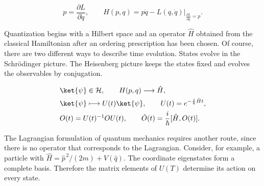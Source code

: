 \begin{equation}
  p=\frac{\partial L}{\partial\dot q},
  \qquad
  H(p,q)=
  \left.p\dot q-L(q,\dot q)\right|_{\frac{\partial L}{\partial\dot q}=p}.
  \label{eq:proposal-legendre-transform}
\end{equation}

Quantization begins with a Hilbert space and an operator $\hat H$ obtained from
the classical Hamiltonian after an ordering prescription has been chosen.  Of
course, there are two different ways to describe time evolution.  States
evolve in the Schr\"odinger picture.  The Heisenberg picture keeps the states
fixed and evolves the observables by conjugation.

\begin{align}
  &\ket{\psi}\in\mathcal H,
  \qquad H(p,q)\longrightarrow\hat H,
  \label{eq:proposal-quantum-bridge}\\
  &\ket{\psi}\longmapsto U(t)\ket{\psi},
  \qquad
  U(t)=e^{-\frac{i}{\hbar}\hat Ht},
  \label{eq:proposal-schrodinger-evolution}\\
  &O(t)=U(t)^{-1}OU(t),
  \qquad
  \dot O(t)=\frac{i}{\hbar}[\hat H,O(t)].
  \label{eq:proposal-heisenberg-evolution}
\end{align}

The Lagrangian formulation of quantum mechanics requires another route, since
there is no operator that corresponds to the Lagrangian.  Consider, for
example, a particle with
$\hat H=\hat p^{\,2}/(2m)+V(\hat q)$.  The coordinate eigenstates form a
complete basis.  Therefore the matrix elements of $U(T)$ determine its action
on every state.

